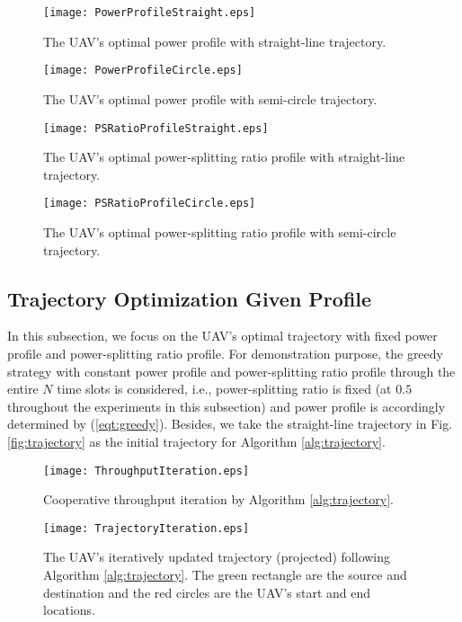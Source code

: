 \documentclass[12pt, draftclsnofoot, onecolumn]{IEEEtran}
\begin{document}
\def\2Win{4.3in}
\begin{figure*}
\centering
\begin{minipage}[t]{\2Win}
\texttt{[image: PowerProfileStraight.eps]}
\caption{The UAV's optimal power profile with straight-line trajectory.}
\label{fig:PowerProfileStraight}
\end{minipage}
\begin{minipage}[t]{\2Win}
\texttt{[image: PowerProfileCircle.eps]}
\caption{The UAV's optimal power profile with semi-circle trajectory.}
\label{fig:PowerProfileCircle}
\end{minipage}
\end{figure*}

\def\2Win{4.3in}
\begin{figure*}
\centering
\begin{minipage}[t]{\2Win}
\texttt{[image: PSRatioProfileStraight.eps]}
\caption{The UAV's optimal power-splitting ratio profile with straight-line trajectory.}
\label{fig:PSRatioProfileStraight}
\end{minipage}
\begin{minipage}[t]{\2Win}
\texttt{[image: PSRatioProfileCircle.eps]}
\caption{The UAV's optimal power-splitting ratio profile with semi-circle trajectory.}
\label{fig:PSRatioProfileCircle}
\end{minipage}
\end{figure*}

\subsection{Trajectory Optimization Given Profile}
In this subsection, we focus on the UAV's optimal trajectory with fixed power profile and power-splitting ratio profile. For demonstration purpose, the greedy strategy with constant power profile and power-splitting ratio profile through the entire $N$ time slots is considered, i.e., power-splitting ratio is fixed (at $0.5$ throughout the experiments in this subsection) and power profile is accordingly determined by (\ref{eqt:greedy}). Besides, we take the straight-line trajectory in Fig. \ref{fig:trajectory} as the initial trajectory for Algorithm \ref{alg:trajectory}.

\def\2Win{4.3in}
\begin{figure*}
\centering
\begin{minipage}[t]{\2Win}
\texttt{[image: ThroughputIteration.eps]}
\caption{Cooperative throughput iteration by Algorithm \ref{alg:trajectory}.}
\label{fig:ThroughputIteration}
\end{minipage}
\begin{minipage}[t]{\2Win}
\texttt{[image: TrajectoryIteration.eps]}
\caption{The UAV's iteratively updated trajectory (projected) following Algorithm \ref{alg:trajectory}. The green rectangle are the source and destination and the red circles are the UAV's start and end locations.}
\label{fig:TrajectoryIteration}
\end{minipage}
\end{figure*}
\end{document}
